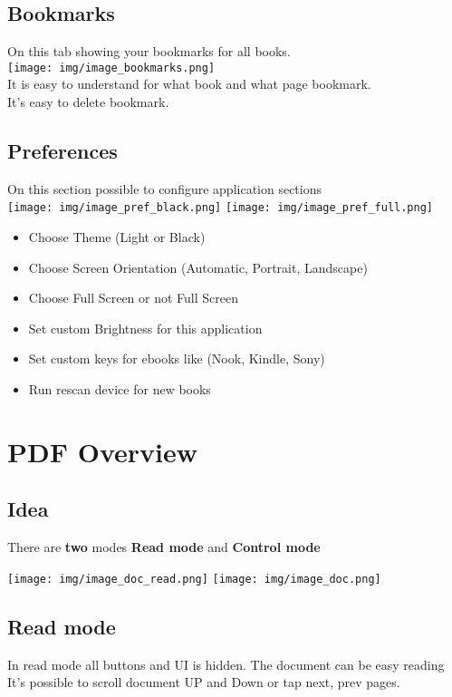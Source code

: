 \documentclass[14pt,letter]{article}
\begin{document}
\subsection{Bookmarks}
On this tab showing your bookmarks for all books.\\
\texttt{[image: img/image\_bookmarks.png]} \\
It is easy to understand for what book and what page bookmark.\\
It's easy to delete bookmark.

\subsection{Preferences}
On this section possible to configure application sections \\
\texttt{[image: img/image\_pref\_black.png]}
\texttt{[image: img/image\_pref\_full.png]}
\\
\begin{itemize}
  \item Choose Theme (Light or Black)
  \item Choose Screen Orientation (Automatic, Portrait, Landscape)
  \item Choose Full Screen or not Full Screen
  \item Set custom Brightness for this application
  \item Set custom keys for ebooks like (Nook, Kindle, Sony)
  \item Run rescan device for new books
\end{itemize}


\newpage
\section{PDF Overview}
\subsection{Idea}
There are \textbf{two} modes \textbf{Read mode} and \textbf{Control mode}

\texttt{[image: img/image\_doc\_read.png]}
\texttt{[image: img/image\_doc.png]}


\subsection{Read mode}
In read mode all buttons and UI is hidden. The document can be easy reading
It's possible to scroll document UP and Down or tap next, prev pages.
\end{document}
